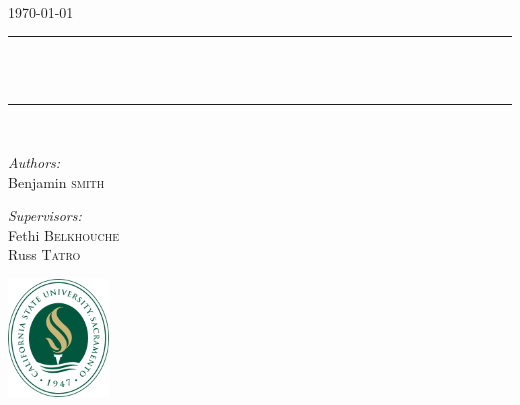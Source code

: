 \begin{titlepage}
	\begin{center}
	\vspace{20 cm}
	
	\textsc{\LARGE \COURSE}\\[1.3cm]
	
	\textsc{\Large \today}\\[0.5cm]
	
	\vspace{5 mm}
	
	\rule{415pt}{2pt}\\
	{ \huge \bfseries \TITLE \\[0.2cm] }
	\rule{415pt}{2pt}\\
	
	\vspace{10mm}
	
	\begin{minipage}{0.4\textwidth}
	\begin{flushleft} \large
	
	\emph{Authors:}\\
	Benjamin \textsc{smith}\\
	\end{flushleft}
	\end{minipage}
	\begin{minipage}{0.4\textwidth}
	\begin{flushright} \large
	
	\emph{Supervisors:} \\
	Fethi 	\textsc{Belkhouche} \\
	Russ	\textsc{Tatro}
	\end{flushright}
	\end{minipage}
	
	\vfill
	
	\includegraphics[width=0.2\textwidth]{./logo}~\\[1cm]
		
	\end{center}
\end{titlepage}